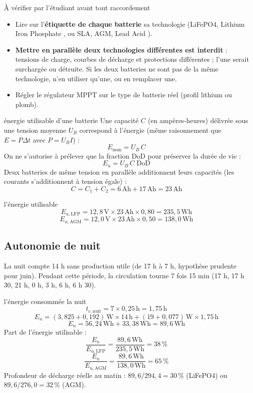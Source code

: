 \documentclass[11pt,a4paper]{article}
\newcommand{\U}[1]{\,\mathrm{#1}}
\begin{document}
\begin{alerte}{À vérifier par l'étudiant avant tout raccordement}
\begin{itemize}[nosep]
\item Lire sur l'\textbf{étiquette de chaque batterie} sa technologie (LiFePO4, \og Lithium Iron Phosphate \fg, ou \og SLA, AGM, Lead Acid \fg).
\item \textbf{Mettre en parallèle deux technologies différentes est interdit} : tensions de charge, courbes de décharge et protections différentes ; l'une serait surchargée ou détruite. Si les deux batteries ne sont pas de la même technologie, n'en utiliser qu'une, ou en remplacer une.
\item Régler le régulateur MPPT sur le type de batterie réel (profil lithium ou plomb).
\end{itemize}
\end{alerte}

\begin{demo}{énergie utilisable d'une batterie}
Une capacité $C$ (en ampères-heures) délivrée sous une tension moyenne $U_B$ correspond à l'énergie (même raisonnement que $E = P \Delta t$ avec $P = U_B I$) :
\[
E_{\text{nom}} = U_B \, C
\]
On ne s'autorise à prélever que la fraction DoD pour préserver la durée de vie :
\[
E_u = U_B \, C \; \text{DoD}
\]
Deux batteries de même tension en parallèle additionnent leurs capacités (les courants s'additionnent à tension égale) :
\[
C = C_1 + C_2 = 6\U{Ah} + 17\U{Ah} = 23\U{Ah}
\]
\end{demo}

\begin{calcul}{l'énergie utilisable}
\[
E_{u,\text{LFP}} = 12{,}8\U{V} \times 23\U{Ah} \times 0{,}80 = 235{,}5\U{Wh}
\]
\[
E_{u,\text{AGM}} = 12{,}0\U{V} \times 23\U{Ah} \times 0{,}50 = 138{,}0\U{Wh}
\]
\end{calcul}

\subsection{Autonomie de nuit}

La nuit compte 14 h sans production utile (de 17 h à 7 h, hypothèse prudente pour juin). Pendant cette période, la circulation tourne 7 fois 15 min (17 h, 17 h 30, 21 h, 0 h, 3 h, 6 h, 6 h 30).

\begin{calcul}{l'énergie consommée la nuit}
\[
t_{c,\text{nuit}} = 7 \times 0{,}25\U{h} = 1{,}75\U{h}
\]
\[
E_n = (3{,}825 + 0{,}192)\U{W} \times 14\U{h} + (19 + 0{,}077)\U{W} \times 1{,}75\U{h}
\]
\[
E_n = 56{,}24\U{Wh} + 33{,}38\U{Wh} = 89{,}6\U{Wh}
\]
Part de l'énergie utilisable :
\[
\frac{E_n}{E_{u,\text{LFP}}} = \frac{89{,}6\U{Wh}}{235{,}5\U{Wh}} = 38\U{\%}
\]
\[
\frac{E_n}{E_{u,\text{AGM}}} = \frac{89{,}6\U{Wh}}{138{,}0\U{Wh}} = 65\U{\%}
\]
Profondeur de décharge réelle au matin : $89{,}6 / 294{,}4 = 30\U{\%}$ (LiFePO4) ou $89{,}6 / 276{,}0 = 32\U{\%}$ (AGM).
\end{calcul}
\end{document}
